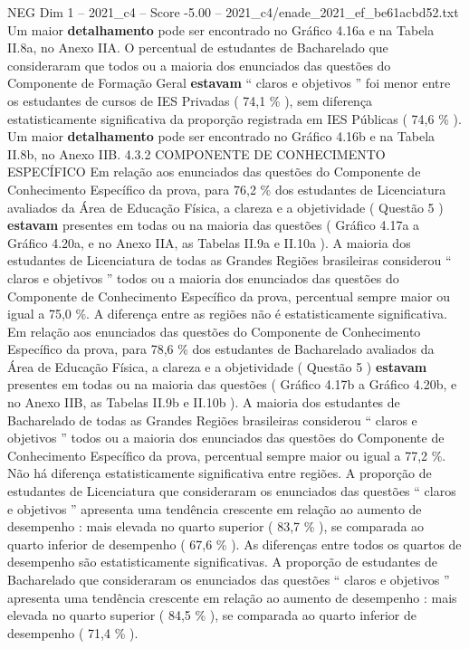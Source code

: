 \begin{textsample}{NEG Dim 1 – 2021\_c4 – Score -5.00 – 2021\_c4/enade\_2021\_ef\_be61acbd52.txt}
Um maior \textbf{detalhamento} pode ser encontrado no Gráfico 4.16a e na Tabela II.8a, no Anexo IIA.
O percentual de estudantes de Bacharelado que consideraram que todos ou a maioria dos enunciados das questões do Componente de Formação Geral \textbf{estavam} “ claros e objetivos ” foi menor entre os estudantes de cursos de IES Privadas ( 74,1 \% ), sem diferença estatisticamente significativa da proporção registrada em IES Públicas ( 74,6 \% ).
Um maior \textbf{detalhamento} pode ser encontrado no Gráfico 4.16b e na Tabela II.8b, no Anexo IIB. 4.3.2 COMPONENTE DE CONHECIMENTO ESPECÍFICO Em relação aos enunciados das questões do Componente de Conhecimento Específico da prova, para 76,2 \% dos estudantes de Licenciatura avaliados da Área de Educação Física, a clareza e a objetividade ( Questão 5 ) \textbf{estavam} presentes em todas ou na maioria das questões ( Gráfico 4.17a a Gráfico 4.20a, e no Anexo IIA, as Tabelas II.9a e II.10a ).
A maioria dos estudantes de Licenciatura de todas as Grandes Regiões brasileiras considerou “ claros e objetivos ” todos ou a maioria dos enunciados das questões do Componente de Conhecimento Específico da prova, percentual sempre maior ou igual a 75,0 \%.
A diferença entre as regiões não é estatisticamente significativa.
Em relação aos enunciados das questões do Componente de Conhecimento Específico da prova, para 78,6 \% dos estudantes de Bacharelado avaliados da Área de Educação Física, a clareza e a objetividade ( Questão 5 ) \textbf{estavam} presentes em todas ou na maioria das questões ( Gráfico 4.17b a Gráfico 4.20b, e no Anexo IIB, as Tabelas II.9b e II.10b ).
A maioria dos estudantes de Bacharelado de todas as Grandes Regiões brasileiras considerou “ claros e objetivos ” todos ou a maioria dos enunciados das questões do Componente de Conhecimento Específico da prova, percentual sempre maior ou igual a 77,2 \%.
Não há diferença estatisticamente significativa entre regiões.
A proporção de estudantes de Licenciatura que consideraram os enunciados das questões “ claros e objetivos ” apresenta uma tendência crescente em relação ao aumento de desempenho : mais elevada no quarto superior ( 83,7 \% ), se comparada ao quarto inferior de desempenho ( 67,6 \% ).
As diferenças entre todos os quartos de desempenho são estatisticamente significativas.
A proporção de estudantes de Bacharelado que consideraram os enunciados das questões “ claros e objetivos ” apresenta uma tendência crescente em relação ao aumento de desempenho : mais elevada no quarto superior ( 84,5 \% ), se comparada ao quarto inferior de desempenho ( 71,4 \% ).

\end{textsample}
